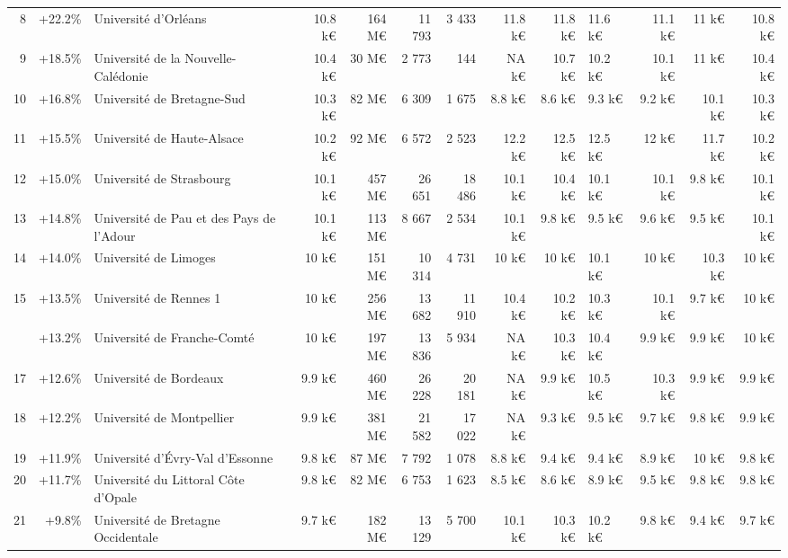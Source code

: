 \documentclass[11pt,french,landscape]{article}
\begin{document}
\begin{longtable}{rrlrrrrrrlrrr}
8 & +22.2\% & Université d'Orléans & 10.8 k€ & 164 M€ & 11 793 & 3 433 & 11.8 k€ & 11.8 k€ & 11.6 k€ & 11.1 k€ & 11 k€ & 10.8 k€\\
\rowcolor{gray!6}  9 & +18.5\% & Université de la Nouvelle-Calédonie & 10.4 k€ & 30 M€ & 2 773 & 144 & NA k€ & 10.7 k€ & 10.2 k€ & 10.1 k€ & 11 k€ & 10.4 k€\\
10 & +16.8\% & Université de Bretagne-Sud & 10.3 k€ & 82 M€ & 6 309 & 1 675 & 8.8 k€ & 8.6 k€ & 9.3 k€ & 9.2 k€ & 10.1 k€ & 10.3 k€\\
\addlinespace
\rowcolor{gray!6}  11 & +15.5\% & Université de Haute-Alsace & 10.2 k€ & 92 M€ & 6 572 & 2 523 & 12.2 k€ & 12.5 k€ & 12.5 k€ & 12 k€ & 11.7 k€ & 10.2 k€\\
12 & +15.0\% & Université de Strasbourg & 10.1 k€ & 457 M€ & 26 651 & 18 486 & 10.1 k€ & 10.4 k€ & 10.1 k€ & 10.1 k€ & 9.8 k€ & 10.1 k€\\
\rowcolor{gray!6}  13 & +14.8\% & Université de Pau et des Pays de l'Adour & 10.1 k€ & 113 M€ & 8 667 & 2 534 & 10.1 k€ & 9.8 k€ & 9.5 k€ & 9.6 k€ & 9.5 k€ & 10.1 k€\\
14 & +14.0\% & Université de Limoges & 10 k€ & 151 M€ & 10 314 & 4 731 & 10 k€ & 10 k€ & 10.1 k€ & 10 k€ & 10.3 k€ & 10 k€\\
\rowcolor{gray!6}  15 & +13.5\% & Université de Rennes 1 & 10 k€ & 256 M€ & 13 682 & 11 910 & 10.4 k€ & 10.2 k€ & 10.3 k€ & 10.1 k€ & 9.7 k€ & 10 k€\\
\addlinespace
16 & +13.2\% & Université de Franche-Comté & 10 k€ & 197 M€ & 13 836 & 5 934 & NA k€ & 10.3 k€ & 10.4 k€ & 9.9 k€ & 9.9 k€ & 10 k€\\
\rowcolor{gray!6}  17 & +12.6\% & Université de Bordeaux & 9.9 k€ & 460 M€ & 26 228 & 20 181 & NA k€ & 9.9 k€ & 10.5 k€ & 10.3 k€ & 9.9 k€ & 9.9 k€\\
18 & +12.2\% & Université de Montpellier & 9.9 k€ & 381 M€ & 21 582 & 17 022 & NA k€ & 9.3 k€ & 9.5 k€ & 9.7 k€ & 9.8 k€ & 9.9 k€\\
\rowcolor{gray!6}  19 & +11.9\% & Université d'Évry-Val d'Essonne & 9.8 k€ & 87 M€ & 7 792 & 1 078 & 8.8 k€ & 9.4 k€ & 9.4 k€ & 8.9 k€ & 10 k€ & 9.8 k€\\
20 & +11.7\% & Université du Littoral Côte d'Opale & 9.8 k€ & 82 M€ & 6 753 & 1 623 & 8.5 k€ & 8.6 k€ & 8.9 k€ & 9.5 k€ & 9.8 k€ & 9.8 k€\\
\addlinespace
\rowcolor{gray!6}  21 & +9.8\% & Université de Bretagne Occidentale & 9.7 k€ & 182 M€ & 13 129 & 5 700 & 10.1 k€ & 10.3 k€ & 10.2 k€ & 9.8 k€ & 9.4 k€ & 9.7 k€\\

\end{longtable}
\end{document}
